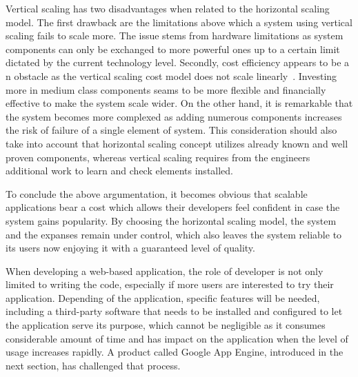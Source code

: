 Vertical scaling has two disadvantages when related to the horizontal scaling model. The first drawback are the limitations above which a system using vertical scaling fails to scale more. The issue stems from hardware limitations as system components can only be exchanged to more powerful ones up to a certain limit dictated by the current technology level. Secondly, cost efficiency appears to be a n obstacle as the vertical scaling cost model does not scale linearly~\cite[page 204]{build_scalable}. Investing more in medium class components seams to be more flexible and financially effective to make the system scale wider. On the other hand, it is remarkable that the system becomes more complexed as adding numerous components increases the risk of failure of a single element of system. This consideration should also take into account that horizontal scaling concept utilizes already known and well proven components, whereas vertical scaling requires from the engineers additional work to learn and check elements installed.

To conclude the above argumentation, it becomes obvious that scalable applications bear a cost which allows their developers feel confident in case the system gains popularity. By choosing the horizontal scaling model, the system and the expanses remain under control, which also leaves the system reliable to its users now enjoying it with a guaranteed level of quality. 

When developing a web-based application, the role of developer is not only limited to writing the code, especially if more users are interested to try their application. Depending of the application, specific features will be needed, including a third-party software that needs to be installed and configured to let the application serve its purpose, which cannot be negligible as it consumes considerable amount of time and has impact on the application when the level of usage increases rapidly. A product called Google App Engine, introduced in the next section, has challenged that process.  
 
